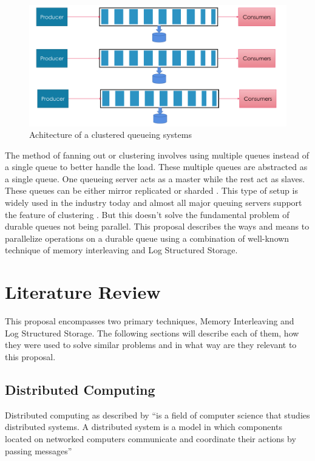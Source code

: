 \documentclass[12pt,a4paper]{article}
\begin{document}
\begin{figure}[!htb]
   	\centering
   	\textbf{}\par\medskip
   	\includegraphics[scale=0.6]{2}
   	\caption{Achitecture of a clustered queueing systems}
   	\label{fig:gdulld}
\end{figure}
     
 
 The method of fanning out or clustering involves using multiple queues instead of a single queue to better handle the load. These multiple queues are abstracted as a single queue. One queueing server acts as a master while the rest act as slaves. These queues can be either mirror replicated or sharded \citep{albrecht2013making}. This type of setup is widely used in the industry today and almost all major queuing servers support the feature of clustering \citep{kermarrec2013xl}. But this doesn't solve the fundamental problem of durable queues not being parallel. This proposal describes the ways and means to parallelize operations on a durable queue using a combination of well-known technique of memory interleaving and Log Structured Storage.

 
\section{Literature Review}
\label{ric:litreview} %

This proposal encompasses two primary techniques, Memory Interleaving and Log Structured Storage. The following sections will describe each of them, how they were used to solve similar problems and in what way are they relevant to this proposal.

\subsection{Distributed Computing}

	 Distributed computing as described by \citep{coulouris2005distributed} 
	 \enquote{is a field of computer science that studies distributed systems. A distributed system is a model in which components located on networked computers communicate and coordinate their actions by passing messages}
	 
\end{document}
